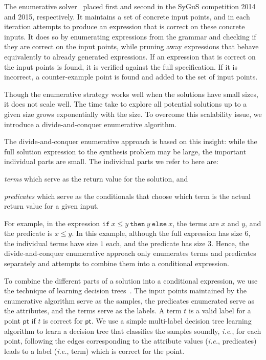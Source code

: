 \documentclass{llncs}
\newcommand\arsays[1]{{\color{red} \bf AR: #1}}
\newcommand{\ie}{\emph{i.e.}}
\newcommand\Point{\mathsf{pt}}
\newcommand\Term{t}
\newcommand\ITE[3]{\mathtt{if}~#1~\mathtt{then}~#2~\mathtt{else}~#3}
\newcommand{\sygus}{{\sffamily\fontsize{8.5}{10}\selectfont
    SyGuS}\xspace}
\begin{document}
The enumerative solver~\cite{udupa-sygus}
placed first and second in the \sygus competition 2014 and 2015,
respectively.
It maintains a set of concrete input points, and
in each iteration attempts to produce an expression that is correct on
these concrete inputs.
It does so by enumerating expressions from the grammar and checking if
they are correct on the input points, while pruning away expressions
that behave equivalently to already generated expressions.
If an expression that is correct on the input points is found, it is
verified against the full specification.
If it is incorrect, a counter-example point is found and added to the
set of input points.

Though the enumerative strategy works well when the solutions
have small sizes, it does not scale well.
The time take to explore all potential solutions up to a given size grows
exponentially with the size.
To overcome this scalability issue, we introduce a divide-and-conquer
enumerative algorithm.

The divide-and-conquer enumerative approach is based on this insight:
while the full solution expression to the synthesis problem may be
large, the important individual parts are small.
The individual parts we refer to here are:
\begin{inparaenum}[(a)]
\item {\em terms} which serve as the return value for the solution,
  and
\item {\em predicates} which serve as the conditionals that choose which
  term is the actual return value for a given input.
\end{inparaenum}
For example, in the expression $\ITE{x \leq y}{y}{x}$, the terms are $x$
and $y$, and the predicate is $x \leq y$.
In this example, although the full expression has size $6$,
the individual terms have size $1$ each, and the predicate has size $3$.
Hence, the divide-and-conquer enumerative approach only enumerates terms
and predicates separately and attempts to combine them into a
conditional expression.

To combine the different parts of a solution into a conditional
expression, we use the technique of learning decision
trees~\cite{quinlan-86,bishop-book}.  The input points maintained by
the enumerative algorithm serve as the samples, the predicates
enumerated serve as the attributes, and the terms serve as the labels.
A term $\Term$ is a valid label for a point $\Point$ if $\Term$ is
correct for $\Point$.  We use a simple multi-label decision tree
learning algorithm to learn a decision tree that classifies the
samples soundly, \ie, for each point, following the edges
corresponding to the attribute values (\ie, predicates) leads to a
label (\ie, term) which is correct for the point.
\end{document}
